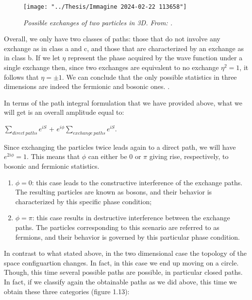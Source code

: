 \documentclass{Configuration_Files/PoliMi3i_thesis}
\begin{document}
\begin{figure}
	\centering
	\texttt{[image: "../Thesis/Immagine 2024-02-22 113658"]}
	\caption{\textit{ Possible exchanges of two particles in 3D. From: \cite{Rao16}.}}
	\label{fig:immagine-2024-02-22-113658}
\end{figure}

Overall, we only have two classes of paths: those that do not involve any exchange as in class a and c, and those that are characterized by an exchange as in class b. { If we let $\eta$ represent the phase acquired by the wave function under a single exchange then, since two exchanges are equivalent to no exchange $\eta^2=1$, it follows that $\eta = \pm 1 $. We can conclude that the only possible statistics in three dimensions are indeed the fermionic and bosonic ones.  \cite{Rao16}}.\newline

In terms of the path integral formulation that we have provided above, what we will get is an overall amplitude equal to:

\begin{center}
	$\sum_{direct \ paths} e^{iS}$ + $e^{i \phi} \sum_{exchange \ paths} e^{iS}$.
\end{center}

Since exchanging the particles twice leads again to a direct path, we will have $e^{2i \phi} = 1$. This means that $\phi$ can either be 0 or $\pi$ giving rise, respectively, to bosonic and fermionic statistics. 

\begin{enumerate}
	\item $\phi = 0$: this case leads to the constructive interference of the exchange paths. The resulting particles are known as bosons, and their behavior is characterized by this specific phase condition;
	
	\item $\phi = \pi$: this case results in destructive interference between the exchange paths. The particles corresponding to this scenario are referred to as fermions, and their behavior is governed by this particular phase condition.
\end{enumerate}

In contrast to what stated above, in the two dimensional case the topology of the space configuartion changes. In fact, in this case we end up moving on a circle. Though, this time several possible paths are possible, in particular closed paths. In fact, if we classify again the obtainable paths as we did above, this time we obtain these three categories (figure 1.13):
\end{document}
